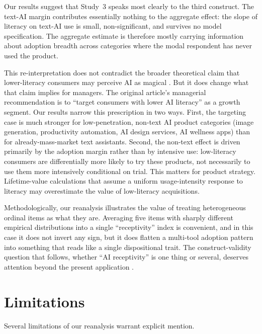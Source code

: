 \documentclass[11pt]{article}
\begin{document}
Our results suggest that Study~3 speaks most clearly to the third
construct. The text-AI margin contributes essentially nothing to the
aggregate effect: the slope of literacy on text-AI use is small,
non-significant, and survives no model specification. The aggregate
estimate is therefore mostly carrying information about adoption breadth
across categories where the modal respondent has never used the product.

This re-interpretation does not contradict the broader theoretical claim
that lower-literacy consumers may perceive AI as magical
\citep{tully2025lower}. But it does change what that claim implies for
managers. The original article's managerial recommendation is to
``target consumers with lower AI literacy'' as a growth segment. Our
results narrow this prescription in two ways. First, the targeting case
is much stronger for low-penetration, non-text AI product categories
(image generation, productivity automation, AI design services, AI
wellness apps) than for already-mass-market text assistants. Second, the
non-text effect is driven primarily by the adoption margin rather than
by intensive use: low-literacy consumers are differentially more likely
to try these products, not necessarily to use them more
intensively conditional on trial. This matters for product strategy.
Lifetime-value calculations that assume a uniform usage-intensity
response to literacy may overestimate the value of low-literacy
acquisitions.

Methodologically, our reanalysis illustrates the value of treating
heterogeneous ordinal items as what they are. Averaging five items with
sharply different empirical distributions into a single ``receptivity''
index is convenient, and in this case it does not invert any sign, but
it does flatten a multi-tool adoption pattern into something that reads
like a single dispositional trait. The construct-validity question that
follows, whether ``AI receptivity'' is one thing or several, deserves
attention beyond the present application
\citep{long2020aileiteracy,ng2021conceptualizing}.

\section{Limitations}

Several limitations of our reanalysis warrant explicit mention.
\end{document}
